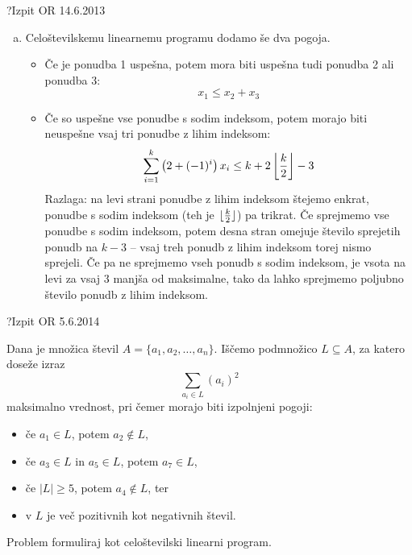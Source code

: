 \begin{naloga}{?}{Izpit OR 14.6.2013}
\begin{odgovor}
\begin{enumerate}[(a)]
\item Celoštevilskemu linearnemu programu dodamo še dva pogoja.
    \begin{itemize}
    \item Če je ponudba 1 uspešna,
    potem mora biti uspešna tudi ponudba 2 ali ponudba 3:
    $$
    x_1 \le x_2 + x_3
    $$
    \item Če so uspešne vse ponudbe s sodim indeksom,
    potem morajo biti ne\-uspeš\-ne vsaj tri ponudbe z lihim indeksom:
    $$
    \sum_{i=1}^{k} \left(2 + (-1)^i\right) x_{i}
    \le k + 2 \left\lfloor {k \over 2} \right\rfloor - 3
    $$
    Razlaga: na levi strani ponudbe z lihim indeksom štejemo enkrat,
    ponudbe s sodim indeksom
    (teh je $\lfloor {k \over 2} \rfloor$)
    pa trikrat.
    Če sprejmemo vse ponudbe s sodim indeksom,
    potem desna stran omejuje število sprejetih ponudb na $k - 3$
    -- vsaj treh ponudb z lihim indeksom torej nismo sprejeli.
    Če pa ne sprejmemo vseh ponudb s sodim indeksom,
    je vsota na levi za vsaj $3$ manjša od maksimalne,
    tako da lahko sprejmemo poljubno število ponudb z lihim indeksom.
    \end{itemize}
\end{enumerate}
\end{odgovor}
\end{naloga}


\begin{naloga}{?}{Izpit OR 5.6.2014}
\begin{vprasanje}
Dana je množica števil $A = \{a_1, a_2, \dots, a_n\}$.
Iščemo podmnožico $L \subseteq A$,
za katero doseže izraz
$$
\sum_{a_i \in L} (a_i)^2
$$
maksimalno vrednost,
pri čemer morajo biti izpolnjeni pogoji:
\begin{itemize}
\item če $a_1 \in L$, potem $a_2 \not\in L$,
\item če $a_3 \in L$ in $a_5 \in L$, potem $a_7 \in L$,
\item če $|L| \ge 5$, potem $a_4 \not\in L$, ter
\item v $L$ je več pozitivnih kot negativnih števil.
\end{itemize}
Problem formuliraj kot celoštevilski linearni program.
\end{vprasanje}
\begin{odgovor}
\end{odgovor}
\end{naloga}


